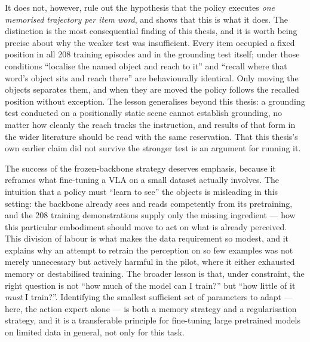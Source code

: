 It does not, however, rule out the hypothesis that the policy executes \emph{one
memorised trajectory per item word}, and  shows that this
is what it does. The distinction is the most consequential finding of this thesis, and
it is worth being precise about why the weaker test was insufficient. Every item
occupied a fixed position in all 208 training episodes and in the grounding test
itself; under those conditions ``localise the named object and reach to it'' and
``recall where that word's object sits and reach there'' are behaviourally identical.
Only moving the objects separates them, and when they are moved the policy follows the
recalled position without exception. The lesson generalises beyond this thesis: a
grounding test conducted on a positionally static scene cannot establish grounding, no
matter how cleanly the reach tracks the instruction, and results of that form in the
wider literature should be read with the same reservation. That this thesis's own
earlier claim did not survive the stronger test is an argument for running it.

The success of the frozen-backbone strategy deserves emphasis, because it reframes
what fine-tuning a VLA on a small dataset actually involves. The intuition that a
policy must ``learn to see'' the objects is misleading in this setting: the backbone
already sees and reads competently from its pretraining, and the 208 training demonstrations
supply only the missing ingredient --- how this particular embodiment should move to
act on what is already perceived. This division of labour is what makes the data
requirement so modest, and it explains why an attempt to retrain the perception on so
few examples was not merely unnecessary but actively harmful in the pilot, where it
either exhausted memory or destabilised training. The broader lesson is that, under
constraint, the right question is not ``how much of the model can I train?'' but ``how
little of it \emph{must} I train?''. Identifying the smallest sufficient set of
parameters to adapt --- here, the action expert alone --- is both a memory strategy and a
regularisation strategy, and it is a transferable principle for fine-tuning large
pretrained models on limited data in general, not only for this task.

